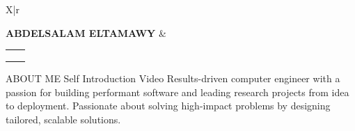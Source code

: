 \documentclass{resume}
\makeatletter
\newcommand{\email}{solom@solom.dev}
\makeatother
\begin{document}
\begin{tabularx}{\textwidth}{X|r}

	{\LARGE\MakeUppercase{\bf Abdelsalam ElTamawy}}
	&
	\small{
		\begin{tabular}{ll}
			\href{mailto:\email}{\iconanot{\faEnvelope}{\email}} & \href{https://solom.dev}{\iconanot{\faGlobe}{solom.dev}} \\
			\href{https://github.com/solomspd}{\iconanot{\faGithub}{github.com/solomspd}} & \href{tel:+201003435365}{\iconanot{\faPhone}{(+20)1003435365}} \\
			\href{https://linkedin.com/in/abdelsalam-et}{\iconanot{\faLinkedin}{/in/abdelsalam-et}} %
		\end{tabular}
	}

\end{tabularx}

\begin{rsection}{\MakeUppercase{about me} \hfill {Self Introduction Video \iconin{\faYoutubePlay}}}{}{}
	Results-driven computer engineer with a passion for building performant software and leading research projects from idea to deployment.
	Passionate about solving high-impact problems by designing tailored, scalable solutions.
\end{rsection}
\end{document}
